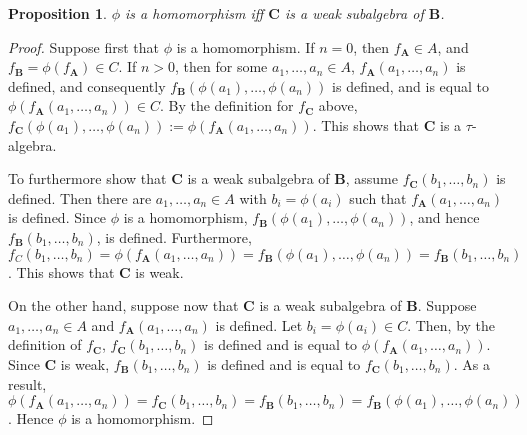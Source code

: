 \documentclass[12pt]{article}
\newtheorem{prop}{Proposition}
\begin{document}
\begin{prop} $\phi$ is a homomorphism iff $\boldsymbol{C}$ is a weak subalgebra of $\boldsymbol{B}$. \end{prop}
\begin{proof}  
Suppose first that $\phi$ is a homomorphism.  If $n=0$, then $f_{\boldsymbol{A}} \in A$, and $f_{\boldsymbol{B}} = \phi(f_{\boldsymbol{A}}) \in C$.  If $n>0$, then for some $a_1,\ldots, a_n\in A$, $f_{\boldsymbol{A}}(a_1, \ldots, a_n)$ is defined, and consequently $f_{\boldsymbol{B}}(\phi(a_1), \ldots, \phi(a_n))$ is defined, and is equal to $\phi(f_{\boldsymbol{A}}(a_1, \ldots, a_n)) \in C$.  By the definition for $f_{\boldsymbol{C}}$ above, $f_{\boldsymbol{C}}(\phi(a_1), \ldots, \phi(a_n)):=\phi(f_{\boldsymbol{A}}(a_1, \ldots, a_n))$.  This shows that $\boldsymbol{C}$ is a $\tau$-algebra.

To furthermore show that $\boldsymbol{C}$ is a weak subalgebra of $\boldsymbol{B}$, assume $f_{\boldsymbol{C}}(b_1,\ldots, b_n)$ is defined.  Then there are $a_1,\ldots, a_n\in A$ with $b_i=\phi(a_i)$ such that $f_{\boldsymbol{A}}(a_1,\ldots, a_n)$ is defined.  Since $\phi$ is a homomorphism, $f_{\boldsymbol{B}}(\phi(a_1),\ldots,\phi(a_n))$, and hence  $f_{\boldsymbol{B}}(b_1,\ldots, b_n)$, is defined.  Furthermore, $f_C(b_1,\ldots, b_n)=\phi(f_{\boldsymbol{A}}(a_1,\ldots, a_n))=f_{\boldsymbol{B}}(\phi(a_1),\ldots,\phi(a_n))=f_{\boldsymbol{B}}(b_1,\ldots, b_n)$.  This shows that $\boldsymbol{C}$ is weak.

On the other hand, suppose now that $\boldsymbol{C}$ is a weak subalgebra of $\boldsymbol{B}$.  Suppose $a_1,\ldots, a_n\in A$ and $f_{\boldsymbol{A}}(a_1,\ldots, a_n)$ is defined.  Let $b_i=\phi(a_i)\in C$.  Then, by the definition of $f_{\boldsymbol{C}}$, $f_{\boldsymbol{C}}(b_1,\ldots, b_n)$ is defined and is equal to $\phi(f_{\boldsymbol{A}}(a_1,\ldots, a_n))$.  Since $\boldsymbol{C}$ is weak, $f_{\boldsymbol{B}}(b_1,\ldots, b_n)$ is defined and is equal to $f_{\boldsymbol{C}}(b_1,\ldots, b_n)$.  As a result, $\phi(f_{\boldsymbol{A}}(a_1,\ldots, a_n))=f_{\boldsymbol{C}}(b_1,\ldots, b_n)=f_{\boldsymbol{B}}(b_1,\ldots, b_n)= f_{\boldsymbol{B}}(\phi(a_1),\ldots, \phi(a_n))$.  Hence $\phi$ is a homomorphism.
\end{proof}
\end{document}
